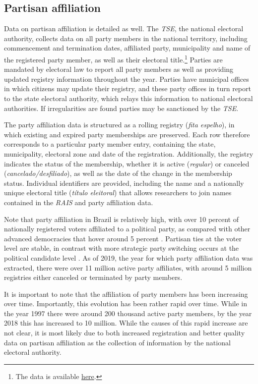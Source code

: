 \documentclass[12pt,a4paper]{article}
\begin{document}
\subsection{Partisan affiliation}

Data on partisan affiliation is detailed as well. The \emph{TSE}, the national electoral authority, collects data on all party members in the national territory, including commencement and termination dates, affiliated party, municipality and name of the registered party member, as well as their electoral title.\footnote{The data is available \href{https://filia-consulta.tse.jus.br/}{here}.} Parties are mandated by electoral law to report all party members as well as providing updated registry information throughout the year. Parties have municipal offices in which citizens may update their registry, and these party offices in turn report to the state electoral authority, which relays this information to national electoral authorities. If irregularities are found parties may be sanctioned by the \emph{TSE}.

The party affiliation data is structured as a rolling registry (\emph{fita espelho}), in which existing and expired party memberships are preserved. Each row therefore corresponds to a particular party member entry, containing the state, municipality, electoral zone and date of the registration. Additionally, the registry indicates the status of the membership, whether it is active (\emph{regular}) or canceled (\emph{cancelado/desfiliado}), as well as the date of the change in the membership status. Individual identifiers are provided, including the name and a nationally unique electoral title (\emph{t\'{i}tulo eleitoral}) that allows researchers to join names contained in the \emph{RAIS} and party affiliation data.

Note that party affiliation in Brazil is relatively high, with over 10 percent of nationally registered voters affiliated to a political party, as compared with other advanced democracies that hover around 5 percent \citep{speck2015estudo}. Partisan ties at the voter level are stable, in contrast with more strategic party switching occurs at the political candidate level \citep{desposato2006parties}. As of 2019, the year for which party affiliation data was extracted, there were over 11 million active party affiliates, with around 5 million registries either canceled or terminated by party members.

It is important to note that the affiliation of party members has been increasing over time. Importantly, this evolution has been rather rapid over time. While in the year 1997 there were around 200 thousand active party members, by the year 2018 this has increased to 10 million. While the causes of this rapid increase are not clear, it is most likely due to both increased registration and better quality data on partisan affiliation as the collection of information by the national electoral authority.
\end{document}
